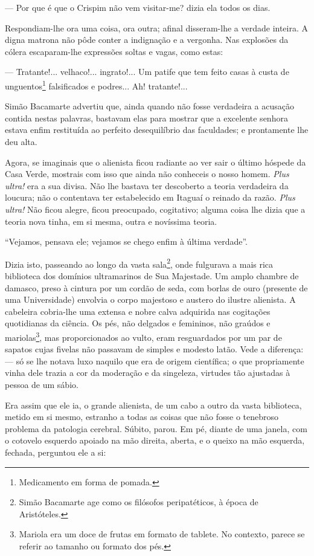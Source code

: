 --- Por que é que o Crispim não vem visitar-me? dizia ela todos os dias.

Respondiam-lhe ora uma coisa, ora outra; afinal disseram-lhe a verdade
inteira. A digna matrona não pôde conter a indignação e a vergonha. Nas
explosões da cólera escaparam-lhe expressões soltas e vagas, como estas:

--- Tratante!... velhaco!... ingrato!... Um patife que tem feito casas à
custa de unguentos\footnote{Medicamento em forma de pomada.}
falsificados e podres... Ah! tratante!...

Simão Bacamarte advertiu que, ainda quando não fosse verdadeira a
acusação contida nestas palavras, bastavam elas para mostrar que a
excelente senhora estava enfim restituída ao perfeito desequilíbrio das
faculdades; e prontamente lhe deu alta.

Agora, se imaginais que o alienista ficou radiante ao ver sair o último
hóspede da Casa Verde, mostrais com isso que ainda não conheceis o nosso
homem. \emph{Plus ultra!} era a sua divisa. Não lhe bastava ter
descoberto a teoria verdadeira da loucura; não o contentava ter
estabelecido em Itaguaí o reinado da razão. \emph{Plus ultra!} Não ficou
alegre, ficou preocupado, cogitativo; alguma coisa lhe dizia que a
teoria nova tinha, em si mesma, outra e novíssima teoria.

``Vejamos, pensava ele; vejamos se chego enfim à última verdade''.

Dizia isto, passeando ao longo da vasta sala\footnote{Simão Bacamarte
  age como os filósofos peripatéticos, à época de Aristóteles.}, onde
fulgurava a mais rica biblioteca dos domínios ultramarinos de Sua
Majestade. Um amplo chambre de damasco, preso à cintura por um cordão de
seda, com borlas de ouro (presente de uma Universidade) envolvia o corpo
majestoso e austero do ilustre alienista. A cabeleira cobria-lhe uma
extensa e nobre calva adquirida nas cogitações quotidianas da ciência.
Os pés, não delgados e femininos, não graúdos e mariolas\footnote{Mariola
  era um doce de frutas em formato de tablete. No contexto, parece se
  referir ao tamanho ou formato dos pés.}, mas proporcionados ao vulto,
eram resguardados por um par de sapatos cujas fivelas não passavam de
simples e modesto latão. Vede a diferença: --- só se lhe notava luxo
naquilo que era de origem científica; o que propriamente vinha dele
trazia a cor da moderação e da singeleza, virtudes tão ajustadas à
pessoa de um sábio.

Era assim que ele ia, o grande alienista, de um cabo a outro da vasta
biblioteca, metido em si mesmo, estranho a todas as coisas que não fosse
o tenebroso problema da patologia cerebral. Súbito, parou. Em pé, diante
de uma janela, com o cotovelo esquerdo apoiado na mão direita, aberta, e
o queixo na mão esquerda, fechada, perguntou ele a si:

